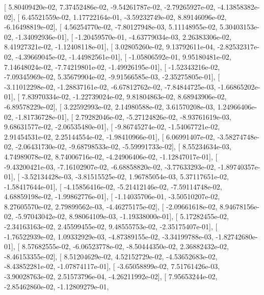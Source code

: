 \documentclass{article}
\begin{document}
       [  5.80409420e-02,   7.37452486e-02,  -9.54261787e-02,
         -2.79265927e-02,  -4.13858382e-02],
       [  6.45521559e-02,   1.17722164e-01,  -3.59232749e-02,
          8.89146096e-02,  -6.16498819e-02],
       [  4.56254770e-02,  -7.80127948e-03,   5.11148955e-02,
          5.30403153e-02,  -1.34092936e-01],
       [ -1.20459570e-01,  -4.63779034e-03,   2.26383306e-02,
          8.41927321e-02,  -1.12408118e-01],
       [  3.02805260e-02,   9.13792611e-04,  -2.82532317e-02,
         -4.39669045e-02,  -1.44982561e-01],
       [ -1.05806592e-01,   9.95180481e-02,   7.14648024e-02,
         -7.74219801e-02,  -1.49926195e-01],
       [ -1.52343216e-02,  -7.09345969e-02,   5.35679904e-02,
         -9.91566585e-03,  -2.35275805e-01],
       [ -3.11012298e-02,  -1.28837161e-02,  -6.67812762e-02,
         -7.84844725e-03,  -1.66865202e-01],
       [  7.83970334e-02,  -1.22739024e-02,   9.81804863e-02,
          8.68943906e-02,  -6.89578229e-02],
       [  3.22592993e-02,   2.14980588e-02,   3.61570208e-03,
          1.24966406e-02,  -1.81736728e-01],
       [  2.79282046e-02,  -5.27124826e-02,  -8.93761619e-03,
          9.68631577e-02,  -2.06535480e-01],
       [ -9.86745274e-02,  -1.54067721e-02,   2.91454531e-02,
          2.25144554e-02,  -1.98410966e-01],
       [  6.06991407e-02,  -3.58274748e-02,  -2.06431730e-02,
         -9.68798533e-02,  -5.59991733e-02],
       [  8.55234634e-03,   4.74989078e-02,   8.74006716e-02,
         -4.24906406e-02,  -1.12847017e-01],
       [ -9.43200421e-03,  -7.16102907e-02,  -6.68858820e-02,
         -3.77633293e-02,  -1.89740357e-01],
       [ -3.52134428e-03,  -3.81515525e-02,   1.96785054e-03,
          5.37117651e-02,  -1.58417644e-01],
       [ -4.15856416e-02,  -5.21412146e-02,  -7.59114748e-02,
          4.68859198e-02,  -1.99862776e-01],
       [ -1.14035706e-01,  -3.50510207e-02,   8.27605570e-02,
          2.79899562e-03,  -4.46275175e-02],
       [ -2.09661618e-02,   8.94678156e-02,  -5.97043042e-02,
          8.98064109e-03,  -1.19338000e-01],
       [  5.17282455e-02,  -2.34163163e-02,   2.45599455e-02,
          9.48555753e-02,  -2.35175407e-01],
       [ -1.76522939e-02,   1.09332929e-03,  -4.87389155e-02,
         -3.34199788e-03,  -1.82742680e-01],
       [  8.57682555e-02,  -6.06523778e-02,  -8.50444350e-02,
          2.36882432e-02,  -8.46153355e-02],
       [  8.51204629e-02,   4.52152729e-02,  -4.53652683e-02,
         -8.43852281e-02,  -1.07874117e-01],
       [ -3.65058899e-02,   7.51761426e-03,  -3.90028763e-02,
          2.51573796e-04,  -4.26211992e-02],
       [  7.95653244e-02,  -2.85462860e-02,  -1.12809279e-01,
\end{document}
